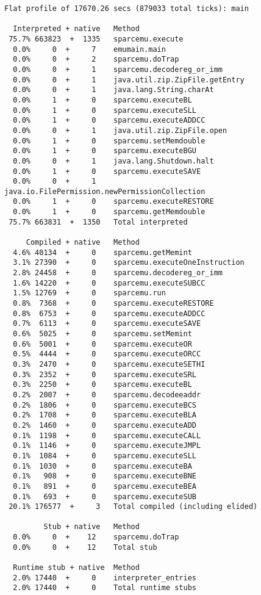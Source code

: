 \begin{verbatim}
Flat profile of 17670.26 secs (879033 total ticks): main

  Interpreted + native   Method                        
 75.7% 663823  +  1335   sparcemu.execute
  0.0%     0  +     7    emumain.main
  0.0%     0  +     2    sparcemu.doTrap
  0.0%     0  +     1    sparcemu.decodereg_or_imm
  0.0%     0  +     1    java.util.zip.ZipFile.getEntry
  0.0%     0  +     1    java.lang.String.charAt
  0.0%     1  +     0    sparcemu.executeBL
  0.0%     1  +     0    sparcemu.executeSLL
  0.0%     1  +     0    sparcemu.executeADDCC
  0.0%     0  +     1    java.util.zip.ZipFile.open
  0.0%     1  +     0    sparcemu.setMemdouble
  0.0%     1  +     0    sparcemu.executeBGU
  0.0%     0  +     1    java.lang.Shutdown.halt
  0.0%     1  +     0    sparcemu.executeSAVE
  0.0%     0  +     1    java.io.FilePermission.newPermissionCollection
  0.0%     1  +     0    sparcemu.executeRESTORE
  0.0%     1  +     0    sparcemu.getMemdouble
 75.7% 663831  +  1350   Total interpreted

     Compiled + native   Method                        
  4.6% 40134  +     0    sparcemu.getMemint
  3.1% 27390  +     0    sparcemu.executeOneInstruction
  2.8% 24458  +     0    sparcemu.decodereg_or_imm
  1.6% 14220  +     0    sparcemu.executeSUBCC
  1.5% 12769  +     0    sparcemu.run
  0.8%  7368  +     0    sparcemu.executeRESTORE
  0.8%  6753  +     0    sparcemu.executeADDCC
  0.7%  6113  +     0    sparcemu.executeSAVE
  0.6%  5025  +     0    sparcemu.setMemint
  0.6%  5001  +     0    sparcemu.executeOR
  0.5%  4444  +     0    sparcemu.executeORCC
  0.3%  2470  +     0    sparcemu.executeSETHI
  0.3%  2352  +     0    sparcemu.executeSRL
  0.3%  2250  +     0    sparcemu.executeBL
  0.2%  2007  +     0    sparcemu.decodeeaddr
  0.2%  1806  +     0    sparcemu.executeBCS
  0.2%  1708  +     0    sparcemu.executeBLA
  0.2%  1460  +     0    sparcemu.executeADD
  0.1%  1198  +     0    sparcemu.executeCALL
  0.1%  1146  +     0    sparcemu.executeJMPL
  0.1%  1084  +     0    sparcemu.executeSLL
  0.1%  1030  +     0    sparcemu.executeBA
  0.1%   908  +     0    sparcemu.executeBNE
  0.1%   891  +     0    sparcemu.executeBEA
  0.1%   693  +     0    sparcemu.executeSUB
 20.1% 176577  +     3   Total compiled (including elided)

         Stub + native   Method                        
  0.0%     0  +    12    sparcemu.doTrap
  0.0%     0  +    12    Total stub

  Runtime stub + native  Method                        
  2.0% 17440  +     0    interpreter_entries
  2.0% 17440  +     0    Total runtime stubs


\end{verbatim}
